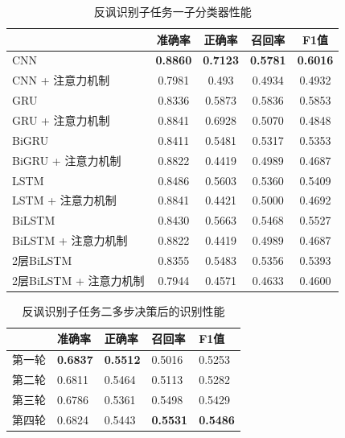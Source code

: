 \begin{table}[htb]
  \centering
  \begin{minipage}[t]{0.8\linewidth}
  \caption{反讽识别子任务一子分类器性能}
  \label{tab:exp_irony_det_Bb03_result}
    \begin{tabularx}{\linewidth}{X|cccc}
    \toprule[1.5pt]
    & 准确率 & 正确率 & 召回率 & F1值 \\
    \hline
    CNN & \bf 0.8860 & \bf 0.7123 & \bf 0.5781 & \bf 0.6016 \\ %
    CNN + 注意力机制 & 0.7981 & 0.493 & 0.4934 & 0.4932 \\ %
    \hline
    GRU & 0.8336 & 0.5873 & 0.5836 & 0.5853 \\ %
    GRU + 注意力机制 & 0.8841 & 0.6928 & 0.5070 &  0.4848 \\ %
    \hline
    BiGRU & 0.8411 & 0.5481 & 0.5317 & 0.5353 \\ %
    BiGRU + 注意力机制 & 0.8822 & 0.4419 & 0.4989 & 0.4687 \\ %
    \hline
    LSTM & 0.8486 & 0.5603 & 0.5360 & 0.5409 \\ %
    LSTM + 注意力机制 & 0.8841 & 0.4421 & 0.5000 & 0.4692 \\ %
    \hline
    BiLSTM & 0.8430 & 0.5663 & 0.5468 & 0.5527 \\ %
    BiLSTM + 注意力机制 & 0.8822 & 0.4419 & 0.4989 & 0.4687 \\ %
    \hline
    2层BiLSTM & 0.8355 & 0.5483 & 0.5356 & 0.5393 \\ %
    2层BiLSTM + 注意力机制 & 0.7944 & 0.4571 & 0.4633 & 0.4600 \\ %
    \bottomrule[1.5pt]
    \end{tabularx}
  \end{minipage}
\end{table}

\begin{table}[htb]
  \centering
  \begin{minipage}[t]{0.7\linewidth}
  \caption{反讽识别子任务二多步决策后的识别性能}
  \label{tab:exp_irony_det_B_ensemble_result}
    \begin{tabularx}{\linewidth}{X|XXXX}
    \toprule[1.5pt]
    & 准确率 & 正确率 & 召回率 & F1值 \\
    \hline
    第一轮 & \bf 0.6837 & \bf 0.5512 & 0.5016 & 0.5253 \\
    第二轮 & 0.6811 & 0.5464 & 0.5113 & 0.5282 \\
    第三轮 & 0.6786 & 0.5361 & 0.5498 & 0.5429 \\ 
    第四轮 & 0.6824 & 0.5443 & \bf 0.5531 & \bf 0.5486 \\
    \bottomrule[1.5pt]
    \end{tabularx}
  \end{minipage}
\end{table}

